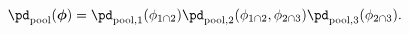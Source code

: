 \begin{equation}
  \pd_{\text{pool}}(\boldsymbol{\phi}) = 
    \pd_{\text{pool}, 1}(\phi_{1 \cap 2})
    \pd_{\text{pool}, 2}(\phi_{1 \cap 2}, \phi_{2 \cap 3})
    \pd_{\text{pool}, 3}(\phi_{2 \cap 3}).
  \label{eqn:parallel-decomposition}
\end{equation}